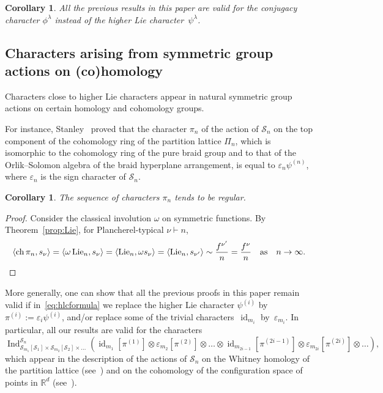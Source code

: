 \documentclass[12pt]%
{amsart}
\newcommand{\bbr}{\mathbb{R}}
\renewcommand\S{{\mathcal S}}
\newcommand{\la}{{\lambda}}
\newcommand{\Lie}{\operatorname{Lie}}
\newcommand{\Ind}{\operatorname{Ind}}
\def\magenta#1{{\color{magenta}{#1}}}
\theoremstyle{plain}
\newtheorem{corollary}[theorem]{Corollary}
\theoremstyle{definition}
\theoremstyle{remark}
\newcommand{\id}{{\operatorname{id}}}
\newcommand{\ve}{\varepsilon}
\newcommand{\ch}{{\operatorname{ch}}}
\begin{document}
\begin{corollary}\label{cor:conjugacy}
   All the previous results in this paper are valid for the conjugacy character $\phi^\la$ instead of the higher Lie character~$\psi^\la$. 
\end{corollary}



\subsection{Characters arising from symmetric group actions on (co)homology}

Characters close to higher Lie characters appear in natural symmetric group actions on certain homology and cohomology groups.

For instance, Stanley~\cite{Stanley1982} proved that the character $\pi_n$ of the action of $\S_n$ on the top component of the cohomology ring of the partition lattice $\Pi_n$,  
which is isomorphic to the cohomology ring of the pure braid group and to that of the Orlik--Solomon algebra of the braid hyperplane arrangement, 
is equal to $\ve_n\psi^{(n)}$, where $\ve_n$ is the sign character of $\S_n$. 


\begin{corollary}
    The sequence of characters $\pi_n$ tends to be regular.    
\end{corollary}
\begin{proof}
    Consider the classical involution $\omega$ on symmetric functions.
    By Theorem~\ref{prop:Lie}, for Plancherel-typical $\nu\vdash n$,
    \[
        \langle \ch\,\pi_n,s_\nu \rangle
        =\langle \omega\Lie_n,s_\nu \rangle
        =\langle \Lie_n,\omega s_\nu \rangle
        =\langle \Lie_n,s_{\nu'} \rangle
        \sim \frac{f^{\nu'}}{n}
        =\frac{f^{\nu}}{n}
        \quad \text{as} \quad n \to \infty. \qedhere
    \]
\end{proof}


More generally, one can show that all the previous proofs in this paper remain valid if in~\eqref{eq:hlcformula} we replace the higher Lie character $\psi^{(i)}$ by $\pi^{(i)}:=\varepsilon_i\psi^{(i)}$, and/or replace some of the trivial characters~$\id_{m_i}$ by~$\varepsilon_{m_i}$. In particular, all our results are valid for the characters
\[
    \Ind_{\S_{m_1}[\S_1]\times\S_{m_2}[\S_2]\times\ldots}^{\S_n}
    \left(\id_{m_1}[\pi^{(1)}]\otimes\varepsilon_{m_2}[\pi^{(2)}]\otimes\ldots
    \otimes\id_{m_{2i-1}}[\pi^{(2i-1)}]\otimes\varepsilon_{m_{2i}}[\pi^{(2i)}]\otimes\ldots\right),  
\]
which appear in the description of the actions of $\S_n$ on the Whitney homology of the partition lattice (see~\cite[Theorem~2.14]{Hersh}) and on the cohomology of the configuration space of points in $\bbr^d$ (see~\cite[Theorem~2.7]{Hersh}).
\end{document}
